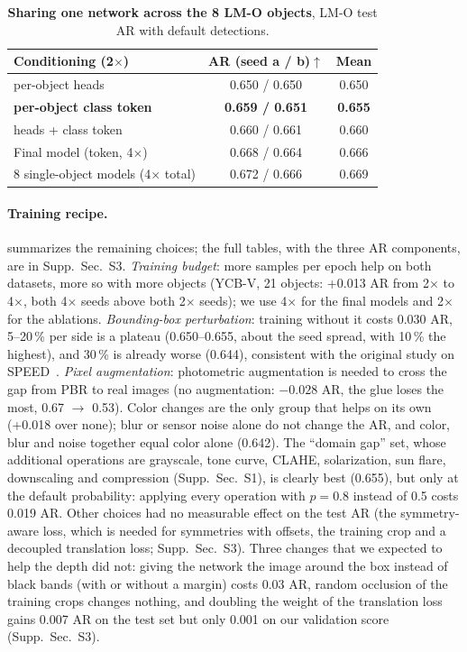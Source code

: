 \begin{table}[t]
  \centering
  \small
  \begin{tabular}{lcc}
    \toprule
    Conditioning (2$\times$) & AR (seed a / b)$\uparrow$ & Mean \\
    \midrule
    per-object heads & 0.650 / 0.650 & 0.650 \\
    \textbf{per-object class token} & \textbf{0.659 / 0.651} & \textbf{0.655} \\
    heads + class token & 0.660 / 0.661 & 0.660 \\
    \midrule
    Final model (token, 4$\times$) & 0.668 / 0.664 & 0.666 \\
    8 single-object models (4$\times$ total) & 0.672 / 0.666 & 0.669 \\
    \bottomrule
  \end{tabular}
  \caption{\textbf{Sharing one network across the 8 LM-O objects}, LM-O test AR with default
  detections.}
  \label{tab:abl_objects}
\end{table}

\paragraph{Training recipe.}
 summarizes the remaining choices; the full tables, with the three AR
components, are in Supp.~Sec.~S3. \emph{Training budget}: more samples per epoch help on both
datasets, more so with more objects (YCB-V, 21 objects: +0.013 AR from 2$\times$ to 4$\times$, both
4$\times$ seeds above both 2$\times$ seeds); we use 4$\times$ for the final models and 2$\times$ for
the ablations. \emph{Bounding-box perturbation}: training without it costs 0.030 AR, 5--20\,\% per
side is a plateau (0.650--0.655, about the seed spread, with 10\,\% the highest), and 30\,\% is
already worse (0.644), consistent with the original study on
SPEED~\cite{ancey2026fastposevit}. \emph{Pixel augmentation}:
photometric augmentation is needed to cross the gap from PBR to real images (no augmentation:
$-0.028$ AR, the glue loses the most, 0.67 $\rightarrow$ 0.53). Color changes are the only group that
helps on its own (+0.018 over none); blur or sensor noise alone do not change the AR, and color,
blur and noise together equal color alone (0.642). The ``domain gap'' set, whose additional
operations are grayscale, tone curve, CLAHE, solarization, sun flare, downscaling and compression
(Supp.~Sec.~S1), is clearly best (0.655), but only at the default probability: applying every operation with $p = 0.8$
instead of 0.5 costs 0.019 AR. Other choices had no measurable effect on the test AR (the
symmetry-aware loss, which is needed for symmetries with offsets, the training crop and a
decoupled translation loss; Supp.~Sec.~S3). Three changes that we expected to help the depth
did not: giving the network the image around the box instead of black bands (with or without a
margin) costs 0.03 AR, random occlusion of the training crops changes nothing, and doubling the
weight of the translation loss gains 0.007 AR on the test set but only 0.001 on our validation
score (Supp.~Sec.~S3).


